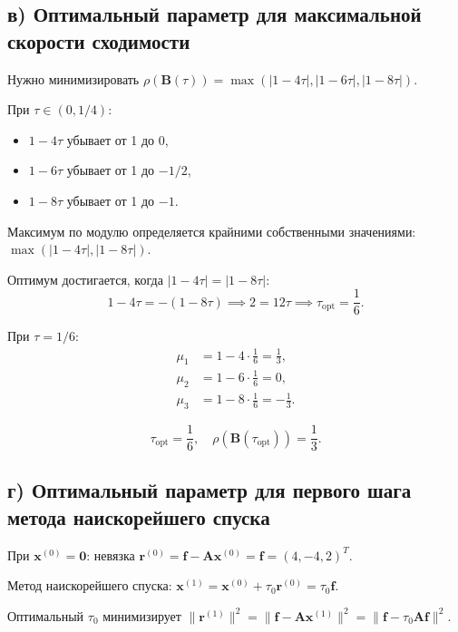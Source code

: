 \documentclass{article}
\begin{document}
\subsection*{в) Оптимальный параметр для максимальной скорости сходимости}

Нужно минимизировать $\rho(\mathbf{B}(\tau)) = \max(|1-4\tau|, |1-6\tau|, |1-8\tau|)$.

При $\tau \in (0, 1/4)$:
\begin{itemize}
\item $1 - 4\tau$ убывает от 1 до 0,
\item $1 - 6\tau$ убывает от 1 до $-1/2$,
\item $1 - 8\tau$ убывает от 1 до $-1$.
\end{itemize}

Максимум по модулю определяется крайними собственными значениями: $\max(|1-4\tau|, |1-8\tau|)$.

Оптимум достигается, когда $|1-4\tau| = |1-8\tau|$:
\begin{equation}
1 - 4\tau = -(1 - 8\tau) \implies 2 = 12\tau \implies \tau_{\text{opt}} = \frac{1}{6}.
\end{equation}

При $\tau = 1/6$:
\begin{align}
\mu_1 &= 1 - 4 \cdot \frac{1}{6} = \frac{1}{3}, \\
\mu_2 &= 1 - 6 \cdot \frac{1}{6} = 0, \\
\mu_3 &= 1 - 8 \cdot \frac{1}{6} = -\frac{1}{3}.
\end{align}

\begin{equation}
\boxed{\tau_{\text{opt}} = \frac{1}{6}, \quad \rho(\mathbf{B}(\tau_{\text{opt}})) = \frac{1}{3}.}
\end{equation}

\subsection*{г) Оптимальный параметр для первого шага метода наискорейшего спуска}

При $\mathbf{x}^{(0)} = \mathbf{0}$: невязка $\mathbf{r}^{(0)} = \mathbf{f} - \mathbf{A}\mathbf{x}^{(0)} = \mathbf{f} = (4, -4, 2)^T$.

Метод наискорейшего спуска: $\mathbf{x}^{(1)} = \mathbf{x}^{(0)} + \tau_0 \mathbf{r}^{(0)} = \tau_0 \mathbf{f}$.

Оптимальный $\tau_0$ минимизирует $\|\mathbf{r}^{(1)}\|^2 = \|\mathbf{f} - \mathbf{A}\mathbf{x}^{(1)}\|^2 = \|\mathbf{f} - \tau_0 \mathbf{A}\mathbf{f}\|^2$.
\end{document}
